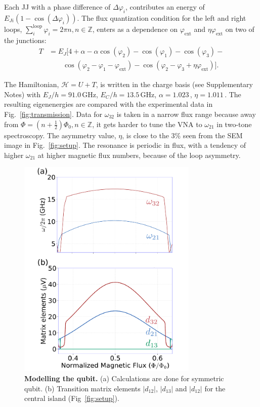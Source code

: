 \documentclass[%
reprint,
superscriptaddress,
bibnotes,
amsmath,
amssymb,
aps,
showkeys,
prb,
]{revtex4-2}
\newcommand{\iunit}[2]{\ensuremath{#1\,\text{#2}}}
\begin{document}
Each  JJ  with  a  phase  difference  of  $\Delta\varphi_{i}$,  contributes  an  energy  of
$ E_{Ji}\left(1 - \cos(\Delta\varphi_i)\right) $.   The flux quantization condition for the
left                     and                    right                     loops,
$ \sum_{i}^{\text{loop}}  \varphi_i = 2\pi  n, n \in \mathbb{Z}$,  enters as a  dependence on
$ \varphi_\text{ext} $ and $ \eta\varphi_\text{ext} $ on two of the junctions:
\begin{equation}\label{eq:kinetic}
  \begin{aligned}
    T & = E_J\big[4 + \alpha - \alpha\cos(\varphi_{2}) -\cos(\varphi_{1}) -\cos(\varphi_{3}) - \\
    &  \qquad  \cos(\varphi_{2}   -  \varphi_{1}  -  \varphi_{\text{ext}})  -  \cos(\varphi_{2}   -  \varphi_{3}  +
    \eta\varphi_{\text{ext}})\big].
  \end{aligned}
\end{equation}

The  Hamiltonian, $\mathcal{H}= U + T$, is  written  in  the charge  basis (see  Supplementary Notes)  with
\iunit{E_J/h = 91.0}{GHz}, \iunit{E_C/h = 13.5}{GHz}, \iunit{\alpha = 1.023}{}, \iunit{\eta
  = 1.011}{}. The resulting eigenenergies are compared with the experimental data in
Fig.~\ref{fig:transmission}.  Data for $ \omega_{32} $ is taken in a narrow flux range
because away from $ \Phi = (n + \frac{1}{2}) \Phi_0, n\in\mathbb{Z} $, it gets harder to tune the VNA to
$ \omega_{21} $  in two-tone spectroscopy.  The  asymmetry value, $ \eta $,  is close to
the  3\%  seen  from  the   SEM  image  in
Fig.~\ref{fig:setup}.  The  resonance is  periodic in flux,  with a  tendency of
higher $\omega_{21}$ at higher magnetic flux numbers, because of the loop asymmetry.

\begin{figure}
  \includegraphics[width=86mm]{fig3}
  \caption{\small \textbf{Modelling the qubit.} 
  (a) Calculations are done for symmetric qubit. (b) Transition matrix elements $|d_{12}|$, $|d_{13}|$ and $|d_{12}|$ for the central island (Fig~\ref{fig:setup}). 
  \label{fig:simulations}}
\end{figure}
\end{document}
